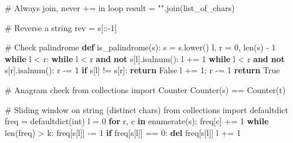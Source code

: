 \documentclass[11pt]{article}
\newenvironment{Shaded}{\begin{snugshade}}{\end{snugshade}}
\newcommand{\BuiltInTok}[1]{\textcolor[rgb]{0.50,0.55,0.55}{#1}}
\newcommand{\CommentTok}[1]{\textcolor[rgb]{0.48,0.49,0.49}{#1}}
\newcommand{\ControlFlowTok}[1]{\textcolor[rgb]{0.99,0.74,0.29}{\textbf{#1}}}
\newcommand{\DecValTok}[1]{\textcolor[rgb]{0.96,0.45,0.00}{#1}}
\newcommand{\ImportTok}[1]{\textcolor[rgb]{0.15,0.68,0.38}{#1}}
\newcommand{\KeywordTok}[1]{\textcolor[rgb]{0.81,0.81,0.76}{\textbf{#1}}}
\newcommand{\NormalTok}[1]{\textcolor[rgb]{0.81,0.81,0.76}{#1}}
\newcommand{\OperatorTok}[1]{\textcolor[rgb]{0.81,0.81,0.76}{#1}}
\newcommand{\StringTok}[1]{\textcolor[rgb]{0.96,0.31,0.31}{#1}}
\newcommand{\VariableTok}[1]{\textcolor[rgb]{0.15,0.68,0.68}{#1}}
\begin{document}
\begin{Shaded}
\begin{Highlighting}[]
\CommentTok{\# Always join, never += in loop}
\NormalTok{result }\OperatorTok{=} \StringTok{""}\NormalTok{.join(list\_of\_chars)}

\CommentTok{\# Reverse a string}
\NormalTok{rev }\OperatorTok{=}\NormalTok{ s[::}\OperatorTok{{-}}\DecValTok{1}\NormalTok{]}

\CommentTok{\# Check palindrome}
\KeywordTok{def}\NormalTok{ is\_palindrome(s):}
\NormalTok{    s }\OperatorTok{=}\NormalTok{ s.lower()}
\NormalTok{    l, r }\OperatorTok{=} \DecValTok{0}\NormalTok{, }\BuiltInTok{len}\NormalTok{(s) }\OperatorTok{{-}} \DecValTok{1}
    \ControlFlowTok{while}\NormalTok{ l }\OperatorTok{\textless{}}\NormalTok{ r:}
        \ControlFlowTok{while}\NormalTok{ l }\OperatorTok{\textless{}}\NormalTok{ r }\KeywordTok{and} \KeywordTok{not}\NormalTok{ s[l].isalnum(): l }\OperatorTok{+=} \DecValTok{1}
        \ControlFlowTok{while}\NormalTok{ l }\OperatorTok{\textless{}}\NormalTok{ r }\KeywordTok{and} \KeywordTok{not}\NormalTok{ s[r].isalnum(): r }\OperatorTok{{-}=} \DecValTok{1}
        \ControlFlowTok{if}\NormalTok{ s[l] }\OperatorTok{!=}\NormalTok{ s[r]: }\ControlFlowTok{return} \VariableTok{False}
\NormalTok{        l }\OperatorTok{+=} \DecValTok{1}\OperatorTok{;}\NormalTok{ r }\OperatorTok{{-}=} \DecValTok{1}
    \ControlFlowTok{return} \VariableTok{True}

\CommentTok{\# Anagram check}
\ImportTok{from}\NormalTok{ collections }\ImportTok{import}\NormalTok{ Counter}
\NormalTok{Counter(s) }\OperatorTok{==}\NormalTok{ Counter(t)}

\CommentTok{\# Sliding window on string (distinct chars)}
\ImportTok{from}\NormalTok{ collections }\ImportTok{import}\NormalTok{ defaultdict}
\NormalTok{freq }\OperatorTok{=}\NormalTok{ defaultdict(}\BuiltInTok{int}\NormalTok{)}
\NormalTok{l }\OperatorTok{=} \DecValTok{0}
\ControlFlowTok{for}\NormalTok{ r, c }\KeywordTok{in} \BuiltInTok{enumerate}\NormalTok{(s):}
\NormalTok{    freq[c] }\OperatorTok{+=} \DecValTok{1}
    \ControlFlowTok{while} \BuiltInTok{len}\NormalTok{(freq) }\OperatorTok{\textgreater{}}\NormalTok{ k:}
\NormalTok{        freq[s[l]] }\OperatorTok{{-}=} \DecValTok{1}
        \ControlFlowTok{if}\NormalTok{ freq[s[l]] }\OperatorTok{==} \DecValTok{0}\NormalTok{: }\KeywordTok{del}\NormalTok{ freq[s[l]]}
\NormalTok{        l }\OperatorTok{+=} \DecValTok{1}
\end{Highlighting}
\end{Shaded}
\end{document}

